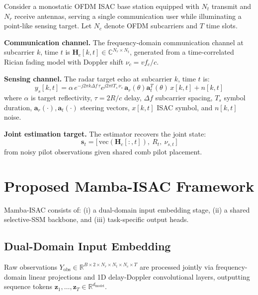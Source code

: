 \documentclass[conference]{IEEEtran}
\begin{document}
Consider a monostatic OFDM ISAC base station equipped with $N_t$ transmit and $N_r$ receive antennas, serving a single communication user while illuminating a point-like sensing target. Let $N_c$ denote OFDM subcarriers and $T$ time slots.

\textbf{Communication channel.} The frequency-domain communication channel at subcarrier $k$, time $t$ is $\mathbf{H}_{c}[k,t] \in \mathbb{C}^{N_r \times N_t}$, generated from a time-correlated Rician fading model with Doppler shift $\nu_c = v f_c / c$.

\textbf{Sensing channel.} The radar target echo at subcarrier $k$, time $t$ is:
\begin{equation}
y_s[k,t] = \alpha \, e^{-j2\pi k \Delta f \, \tau} e^{j2\pi t T_s \, \nu_s} \, \mathbf{a}_r(\theta) \mathbf{a}_t^{T}(\theta) \, x[k,t] + n[k,t]
\label{eq:sensing_echo}
\end{equation}
where $\alpha$ is target reflectivity, $\tau = 2R/c$ delay, $\Delta f$ subcarrier spacing, $T_s$ symbol duration, $\mathbf{a}_r(\cdot), \mathbf{a}_t(\cdot)$ steering vectors, $x[k,t]$ ISAC symbol, and $n[k,t]$ noise.

\textbf{Joint estimation target.} The estimator recovers the joint state:
\begin{equation}
\mathbf{s}_t = \big[\, \text{vec}(\mathbf{H}_c[:,t]),\ R_t,\ \nu_{s,t}\, \big]
\label{eq:joint_state}
\end{equation}
from noisy pilot observations given shared comb pilot placement.

\section{Proposed Mamba-ISAC Framework}

Mamba-ISAC consists of: (i) a dual-domain input embedding stage, (ii) a shared selective-SSM backbone, and (iii) task-specific output heads.

\subsection{Dual-Domain Input Embedding}
Raw observations $Y_{\text{obs}} \in \mathbb{R}^{B \times 2 \times N_r \times N_t \times N_c \times T}$ are processed jointly via frequency-domain linear projections and 1D delay-Doppler convolutional layers, outputting sequence tokens $\mathbf{z}_1, \dots, \mathbf{z}_T \in \mathbb{R}^{d_{\text{model}}}$.
\end{document}
